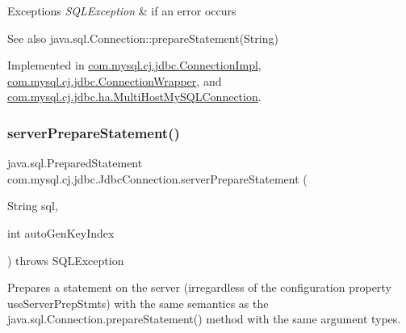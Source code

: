 \begin{DoxyExceptions}{Exceptions}
{\em S\+Q\+L\+Exception} & if an error occurs \\
\hline
\end{DoxyExceptions}
\begin{DoxySeeAlso}{See also}
java.\+sql.\+Connection\+::prepare\+Statement(\+String) 
\end{DoxySeeAlso}


Implemented in \mbox{\hyperlink{classcom_1_1mysql_1_1cj_1_1jdbc_1_1_connection_impl_ad91b5892ca4cc22ca40b2421171b0078}{com.\+mysql.\+cj.\+jdbc.\+Connection\+Impl}}, \mbox{\hyperlink{classcom_1_1mysql_1_1cj_1_1jdbc_1_1_connection_wrapper_aa430608c339c22aff456a59210faaf8b}{com.\+mysql.\+cj.\+jdbc.\+Connection\+Wrapper}}, and \mbox{\hyperlink{classcom_1_1mysql_1_1cj_1_1jdbc_1_1ha_1_1_multi_host_my_s_q_l_connection_a7db176300b273436df94f2cc48e986af}{com.\+mysql.\+cj.\+jdbc.\+ha.\+Multi\+Host\+My\+S\+Q\+L\+Connection}}.

\mbox{\label{interfacecom_1_1mysql_1_1cj_1_1jdbc_1_1_jdbc_connection_a9deb2cebf6538a53be5f24c52ee39f22}} 
\subsubsection{\texorpdfstring{server\+Prepare\+Statement()}{serverPrepareStatement()}\hspace{0.1cm}{\footnotesize\ttfamily [2/6]}}
{\footnotesize\ttfamily java.\+sql.\+Prepared\+Statement com.\+mysql.\+cj.\+jdbc.\+Jdbc\+Connection.\+server\+Prepare\+Statement (\begin{DoxyParamCaption}\item[{String}]{sql,  }\item[{int}]{auto\+Gen\+Key\+Index }\end{DoxyParamCaption}) throws S\+Q\+L\+Exception}

Prepares a statement on the server (irregardless of the configuration property \textquotesingle{}use\+Server\+Prep\+Stmts\textquotesingle{}) with the same semantics as the java.\+sql.\+Connection.\+prepare\+Statement() method with the same argument types.


